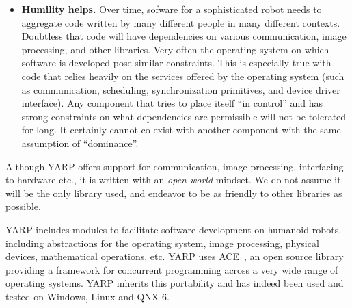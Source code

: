 \begin{itemize}
\item {\bf Humility helps.}
%
Over time, sofware for a sophisticated robot needs to 
aggregate code written by many different people in many
different contexts.  Doubtless that code will have
dependencies on various communication, image processing,
and other libraries. Very often the operating system on which
software is developed pose similar constraints. This is especially
true with code that relies heavily on the services offered by the 
operating system (such as communication, scheduling, synchronization primitives, 
and device driver interface).
%
Any component that tries to place itself ``in control'' and has strong
constraints on what dependencies are permissible will not be tolerated
for long.  It certainly cannot co-exist with another component
with the same assumption of ``dominance''.  







\end{itemize}



\noindent
Although YARP offers support for communication, image processing,
interfacing to hardware etc., it is written with an {\em open world}
mindset.  We do not assume it will be the only library used, and
endeavor to be as friendly to other libraries as possible.

YARP includes modules to facilitate software development on
humanoid robots, including abstractions for the operating system,
image processing, physical devices, mathematical operations, etc.
%
%
YARP uses ACE~\cite{ACEBook}, an open source library providing a framework for
concurrent programming across a very wide range of operating
systems. YARP inherits this portability and has indeed been used and
tested on Windows, Linux and QNX 6.


